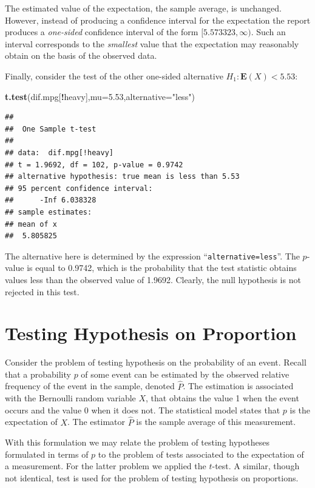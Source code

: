 \documentclass[
]{krantz}
\makeatletter
\newenvironment{Shaded}{\begin{snugshade}}{\end{snugshade}}
\newcommand{\DataTypeTok}[1]{\textcolor[rgb]{0.13,0.29,0.53}{#1}}
\newcommand{\FloatTok}[1]{\textcolor[rgb]{0.00,0.00,0.81}{#1}}
\newcommand{\KeywordTok}[1]{\textcolor[rgb]{0.13,0.29,0.53}{\textbf{#1}}}
\newcommand{\NormalTok}[1]{#1}
\newcommand{\OperatorTok}[1]{\textcolor[rgb]{0.81,0.36,0.00}{\textbf{#1}}}
\newcommand{\StringTok}[1]{\textcolor[rgb]{0.31,0.60,0.02}{#1}}
\newcommand{\Expec}{\mathbf{E}}
\newenvironment{kframe}{%
\medskip{}
\setlength{\fboxsep}{.8em}
 \def\at@end@of@kframe{}%
 \ifinner\ifhmode%
  \def\at@end@of@kframe{\end{minipage}}%
  \begin{minipage}{\columnwidth}%
 \fi\fi%
 \def\FrameCommand##1{\hskip\@totalleftmargin \hskip-\fboxsep
 \colorbox{shadecolor}{##1}\hskip-\fboxsep
     \hskip-\linewidth \hskip-\@totalleftmargin \hskip\columnwidth}%
 \MakeFramed {\advance\hsize-\width
   \@totalleftmargin\z@ \linewidth\hsize
   \@setminipage}}%
 {\par\unskip\endMakeFramed%
 \at@end@of@kframe}
\renewenvironment{Shaded}{\begin{kframe}}{\end{kframe}}
\theoremstyle{definition}
\theoremstyle{definition}
\theoremstyle{definition}
\theoremstyle{remark}
\makeatother
\begin{document}
The estimated value of the expectation, the sample average, is
unchanged. However, instead of producing a confidence interval for the
expectation the report produces a \emph{one-sided} confidence interval of the
form \([5.573323, \infty)\). Such an interval corresponds to the
\emph{smallest} value that the expectation may reasonably obtain on the basis
of the observed data.

Finally, consider the test of the other one-sided alternative
\(H_1:\Expec(X) < 5.53\):

\begin{Shaded}
\begin{Highlighting}[]
\KeywordTok{t.test}\NormalTok{(dif.mpg[}\OperatorTok{!}\NormalTok{heavy],}\DataTypeTok{mu=}\FloatTok{5.53}\NormalTok{,}\DataTypeTok{alternative=}\StringTok{"less"}\NormalTok{)}
\end{Highlighting}
\end{Shaded}

\begin{verbatim}
## 
##  One Sample t-test
## 
## data:  dif.mpg[!heavy]
## t = 1.9692, df = 102, p-value = 0.9742
## alternative hypothesis: true mean is less than 5.53
## 95 percent confidence interval:
##      -Inf 6.038328
## sample estimates:
## mean of x 
##  5.805825
\end{verbatim}

The alternative here is determined by the expression
``\texttt{alternative=less}''. The \(p\)-value is equal to 0.9742, which is the
probability that the test statistic obtains values less than the
observed value of 1.9692. Clearly, the null hypothesis is not rejected
in this test.

\hypertarget{TestFrac}{%
\section{Testing Hypothesis on Proportion}\label{TestFrac}}

Consider the problem of testing hypothesis on the probability of an
event. Recall that a probability \(p\) of some event can be estimated by
the observed relative frequency of the event in the sample, denoted
\(\hat P\). The estimation is associated with the Bernoulli random
variable \(X\), that obtains the value 1 when the event occurs and the
value 0 when it does not. The statistical model states that \(p\) is the
expectation of \(X\). The estimator \(\hat P\) is the sample average of this
measurement.

With this formulation we may relate the problem of testing hypotheses
formulated in terms of \(p\) to the problem of tests associated to the
expectation of a measurement. For the latter problem we applied the
\(t\)-test. A similar, though not identical, test is used for the problem
of testing hypothesis on proportions.
\end{document}
